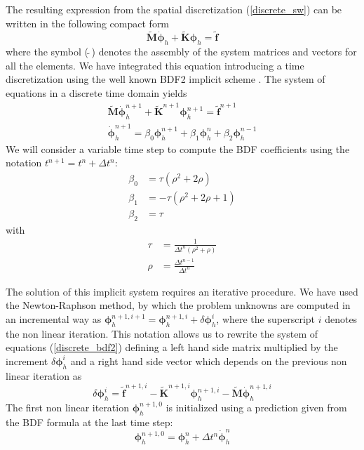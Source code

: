 \documentclass[a4paper,12pt]{elsarticle}
\begin{document}
The resulting expression from the spatial discretization (\ref{discrete_sw}) can be written in the following compact form 
\begin{equation} \label{discrete_compact}
\tilde{\mathbf{M}}\dot{\bm{\phi}}_h + \tilde{\mathbf{K}}\bm{\phi}_h = \tilde{\mathbf{f}}
\end{equation}
where the symbol ($\,\tilde{}\,$) denotes the assembly of the system matrices and vectors for all the elements.
We have integrated this equation introducing a time discretization using the well known BDF2 implicit scheme \cite{curtiss1952,brayton1972}. The system of equations in a discrete time domain yields
\begin{equation}
\begin{split} \label{discrete_bdf2}
\tilde{\mathbf{M}}\dot{\bm{\phi}}_h^{n+1} + \tilde{\mathbf{K}}^{n+1}\bm{\phi}_h^{n+1} = \tilde{\mathbf{f}}^{n+1} \\
\dot{\bm{\phi}}_h^{n+1} = \beta_0 \bm{\phi}_h^{n+1} + \beta_1 \bm{\phi}_h^n + \beta_2 \bm{\phi}_h^{n-1}
\end{split}
\end{equation}
We will consider a variable time step to compute the BDF coefficients using the notation $t^{n+1} = t^n + \Delta t^n$:
\begin{equation}
\begin{split}
\beta_0 &= \tau (\rho^2 + 2\rho) \\
\beta_1 &= -\tau (\rho^2 + 2\rho + 1) \\
\beta_2 &= \tau
\end{split}
\end{equation}
with
\begin{equation}
\begin{split}
\tau &= \frac{1}{\Delta t^n(\rho^2 + \rho)} \\
\rho &= \frac{\Delta t^{n-1}}{\Delta t^n}
\end{split}
\end{equation}

The solution of this implicit system requires an iterative procedure. We have used the Newton-Raphson method, by which the problem unknowns are computed in an incremental way as
$\bm{\phi}_h^{n+1,i+1} = \bm{\phi}_h^{n+1,i} + \delta\bm{\phi}_h^i$,
where the superscript $i$ denotes the non linear iteration.
This notation allows us to rewrite the system of equations (\ref{discrete_bdf2}) defining a left hand side matrix multiplied by the increment $\delta\bm{\phi}_h^i$ and a right hand side vector which depends on the previous non linear iteration as
\begin{equation}
[\beta_0\tilde{\mathbf{M}} + \tilde{\mathbf{K}}^{n+1,i}] \delta\bm{\phi}_h^i
= \tilde{\mathbf{f}}^{n+1,i} - \tilde{\mathbf{K}}^{n+1,i}\bm{\phi}_h^{n+1,i} - \tilde{\mathbf{M}}\dot{\bm{\phi}}_h^{n+1,i}
\end{equation}
The first non linear iteration $\bm{\phi}_h^{n+1,0}$ is initialized using a prediction given from the BDF formula at the last time step:
\begin{equation}
\bm{\phi}_h^{n+1,0} = \bm{\phi}_h^n + \Delta t^n \dot{\bm{\phi}}_h^{n}
\end{equation}
\end{document}
